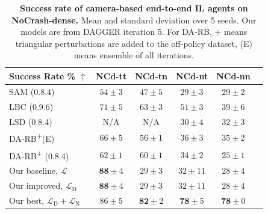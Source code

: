 \begin{table}
	\setlength{\tabcolsep}{2.67pt}
	\centering
	\begin{tabular}{lccccc}
		\hline
		Success Rate \% $\uparrow$
		&  NCd-tt & NCd-tn  & NCd-nt & NCd-nn  \\ 
		\hline
		SAM \cite{zhao2021sam} (0.8.4) & 
		$54 \pm 3$ & $47 \pm 5$ & $29 \pm 3$ & $29 \pm 2$ \\
		LBC \cite{chen2020learning} (0.9.6) & 
		$71 \pm 5$ & $63 \pm 3$ & $51 \pm 3$ & $39 \pm 6$ \\
		LSD \cite{ohn2020learning} (0.8.4) & 
		N/A & N/A & $30 \pm 4$ & $32 \pm 3$ \\
		DA-RB\textsuperscript{+}(E) \cite{prakash2020exploring} & 
		$66 \pm 5$ & $56 \pm 1$ & $36 \pm 3$ & $35 \pm 2$ \\
		DA-RB\textsuperscript{+} \cite{prakash2020exploring} (0.8.4)  & 
		$62 \pm 1$ & $60 \pm 1$ & $34 \pm 2$ & $25 \pm 1$ \\
		Our baseline, $\mathcal{L}$ & 
		$\mathbf{88} \pm 4$ & $29 \pm 3$ & $32 \pm 11$ & $28 \pm 4$ \\
		Our improved, $\mathcal{L}_\text{D} $ & 
		$\mathbf{88} \pm 4$ & $29 \pm 3$ & $32 \pm 11$ & $28 \pm 4$ \\
		Our best, $\mathcal{L}_\text{D}+\mathcal{L}_\text{N}$ & 
		$86 \pm 5$ & $\mathbf{82} \pm 2$ & $\mathbf{78} \pm 5$ & $\mathbf{78} \pm 0$ \\
		\hline
	\end{tabular}
	\vspace{-1ex}
	\caption{\textbf{Success rate of camera-based end-to-end IL agents on NoCrash-dense.}
		Mean and standard deviation over 5 seeds. 
		Our models are from DAGGER iteration 5. 
		For DA-RB, + means triangular perturbations are added to the off-policy dataset, (E) means ensemble of all iterations.}
	\label{table:sucess_rate_nc_dense}
	\vspace{-2ex}
\end{table}

